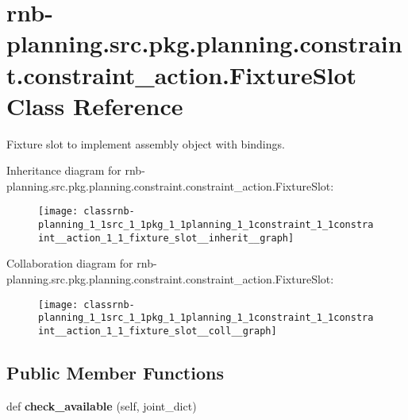 \hypertarget{classrnb-planning_1_1src_1_1pkg_1_1planning_1_1constraint_1_1constraint__action_1_1_fixture_slot}{}\section{rnb-\/planning.src.\+pkg.\+planning.\+constraint.\+constraint\+\_\+action.\+Fixture\+Slot Class Reference}
\label{classrnb-planning_1_1src_1_1pkg_1_1planning_1_1constraint_1_1constraint__action_1_1_fixture_slot}


Fixture slot to implement assembly object with bindings.  




Inheritance diagram for rnb-\/planning.src.\+pkg.\+planning.\+constraint.\+constraint\+\_\+action.\+Fixture\+Slot\+:
\nopagebreak
\begin{figure}[H]
\begin{center}
\leavevmode
\texttt{[image: classrnb-planning\_1\_1src\_1\_1pkg\_1\_1planning\_1\_1constraint\_1\_1constraint\_\_action\_1\_1\_fixture\_slot\_\_inherit\_\_graph]}
\end{center}
\end{figure}


Collaboration diagram for rnb-\/planning.src.\+pkg.\+planning.\+constraint.\+constraint\+\_\+action.\+Fixture\+Slot\+:
\nopagebreak
\begin{figure}[H]
\begin{center}
\leavevmode
\texttt{[image: classrnb-planning\_1\_1src\_1\_1pkg\_1\_1planning\_1\_1constraint\_1\_1constraint\_\_action\_1\_1\_fixture\_slot\_\_coll\_\_graph]}
\end{center}
\end{figure}
\subsection*{Public Member Functions}
\begin{DoxyCompactItemize}
\item 
\mbox{\label{classrnb-planning_1_1src_1_1pkg_1_1planning_1_1constraint_1_1constraint__action_1_1_fixture_slot_a4151315335488fc80d13c1676df71c07}} 
def {\bfseries check\+\_\+available} (self, joint\+\_\+dict)
\end{DoxyCompactItemize}
